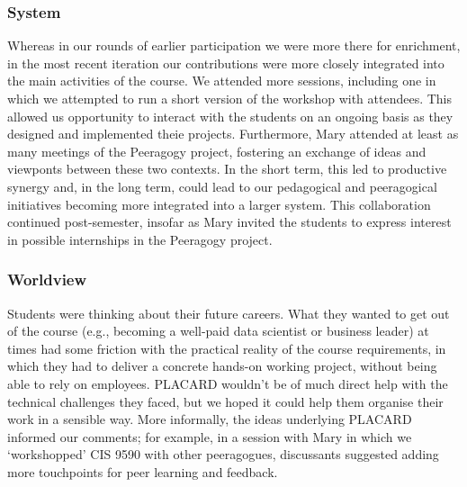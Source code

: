 \documentclass[acmlarge,timestamp]{acmart}
\begin{document}
\subsubsection{System}
Whereas in our rounds of earlier participation we were more there for
enrichment, in the most recent iteration our contributions were more
closely integrated into the main activities of the course. We attended
more sessions, including one in which we attempted to run a short
version of the workshop with attendees.  This allowed us opportunity
to interact with the students on an ongoing basis as they designed and
implemented theie projects.  Furthermore, Mary attended at least as
many meetings of the Peeragogy project, fostering an exchange of ideas
and viewponts between these two contexts. In the short term, this led
to productive synergy and, in the long term, could lead to our
pedagogical and peeragogical initiatives becoming more integrated into
a larger system. This collaboration continued post-semester, insofar
as Mary invited the students to express interest in possible
internships in the Peeragogy project.

\subsubsection{Worldview}
Students were thinking about their future careers.  What they wanted
to get out of the course (e.g., becoming a well-paid data scientist or
business leader) at times had some friction with the practical reality
of the course requirements, in which they had to deliver a concrete
hands-on working project, without being able to rely on employees.
PLACARD wouldn’t be of much direct help with the technical challenges
they faced, but we hoped it could help them organise their work in a
sensible way.  More informally, the ideas underlying PLACARD informed
our comments; for example, in a session with Mary in which we
‘workshopped’ CIS 9590 with other peeragogues, discussants suggested
adding more touchpoints for peer learning and feedback.  
\end{document}
